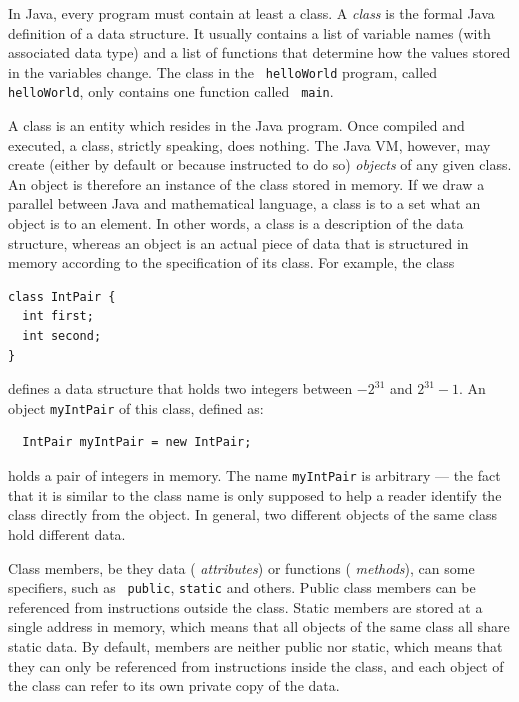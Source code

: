 \documentclass[a4paper]{book}
\theoremstyle{changebreak}                %
\begin{document}
In Java, every program must contain at least a class. A {\it
  class} is the formal Java definition of a data
structure. It usually contains a list of
variable names (with associated data
type) and a list of functions that determine how the
values stored in the variables change. The class in the {\tt
  helloWorld} program, called {\tt
  helloWorld}, only contains one function called {\tt
  main}.

A class is an entity which resides in the Java program. Once compiled
and executed, a class, strictly speaking, does nothing. The Java
VM, however, may create (either by default or
because instructed to do so) {\it objects} of any given
class. An object is therefore an instance of the class stored in
memory. If we draw a parallel between Java and mathematical language,
a class is to a set what an object is to an element. In other words, a
class is a description of the data structure, whereas an object is an
actual piece of data that is structured in memory according to the
specification of its class. For example, the class
\begin{verbatim}
class IntPair {
  int first;
  int second;
}
\end{verbatim}
defines a data structure that holds two integers
between $-2^{31}$ and $2^{31}-1$. An object {\tt myIntPair} of this
class, defined as:
\begin{verbatim}
  IntPair myIntPair = new IntPair;
\end{verbatim}
holds a pair of integers in memory. The name {\tt myIntPair} is
arbitrary --- the fact that it is similar to the class name is only
supposed to help a reader identify the class directly from the object.
In general, two different objects of the same class hold different
data.

Class members, be they data ({\it
  attributes}) or functions ({\it
  methods}), can some specifiers, such as {\tt
  public}, {\tt static} and others. Public
class members can be referenced from instructions
outside the class. Static members are stored at a single
address in memory, which means that all objects
of the same class all share static data. By
default, members are neither public nor static, which means that they
can only be referenced from instructions inside the class, and each
object of the class can refer to its own private copy
of the data.
\end{document}
